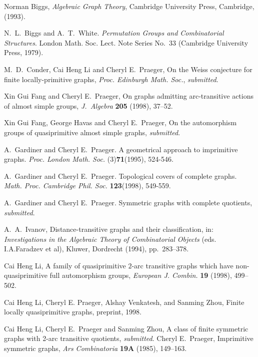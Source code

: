 \documentclass[12pt, a4paper]{article}
\begin{document}
\begin{thebibliography}{99}



Norman Biggs, {\it Algebraic Graph Theory}, Cambridge University Press, 
Cambridge, (1993).

{\sc N.~L.~Biggs} and {\sc A.~T.~White}. 
{\em Permutation Groups and Combinatorial Structures}.
London Math. Soc. Lect. Note Series No.~33
(Cambridge University Press, 1979).

M.~D.~Conder, Cai Heng Li and Cheryl E.~Praeger, On the Weiss
conjecture for finite locally-primitive graphs, {\em Proc. Edinburgh
Math. Soc.}, {\em submitted}.

Xin Gui Fang and Cheryl E.~Praeger,
On graphs admitting arc-transitive actions of almost simple groups, 
{\em J.~Algebra} {\bf 205} (1998), 37--52. 

Xin Gui Fang, George Havas and Cheryl E.~Praeger,
On the automorphism groups of quasiprimitive
almost simple graphs, {\em submitted}.

{\sc A.~Gardiner} and {\sc Cheryl E.~Praeger}. A geometrical approach to
imprimitive graphs.
{\em Proc. London Math. Soc.} (3){\bf 71}(1995), 524-546.

{\sc A.~Gardiner} and {\sc Cheryl E.~Praeger}. 
Topological covers of complete graphs. 
{\em Math. Proc. Cambridge Phil. Soc.} {\bf 123}(1998), 549-559.

{\sc A.~Gardiner} and {\sc Cheryl E.~Praeger}. 
Symmetric graphs with complete quotients,
{\em submitted}.   

A.~A.~Ivanov, Distance-transitive graphs and their classification, in: 
{\it Investigations in the Algebraic Theory of Combinatorial Objects}
(eds. I.A.Faradzev et al), Kluwer, Dordrecht (1994), 
pp.~283--378.

Cai Heng Li, A family of quasiprimitive $2$-arc transitive graphs 
which have non-quasiprimitive full automorphism groups, 
{\em European J. Combin.} {\bf 19} (1998), 499--502.

 
 Cai Heng Li, Cheryl E. Praeger, Alshay Venkatesh, and Sanming Zhou,
 Finite locally quasiprimitive graphs, preprint, 1998.

Cai Heng Li, Cheryl E.~Praeger and Sanming Zhou, A class of finite 
symmetric graphs with  2-arc transitive quotients, {\em submitted}.
Cheryl E.~Praeger, Imprimitive symmetric graphs, 
\emph{Ars Combinatoria}
\textbf{19A} (1985), 149--163.


\end{thebibliography}
\end{document}
